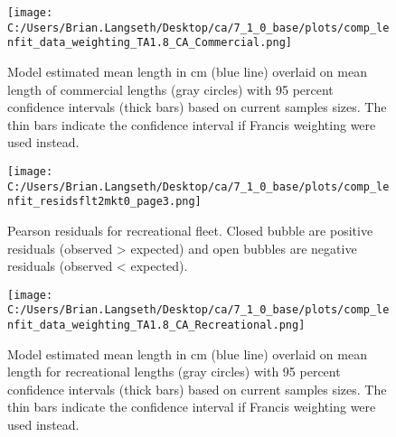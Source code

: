 \documentclass[11pt,
  english,
  a4paper,
]{article}
\begin{document}
\begin{figure}
\centering
\texttt{[image: C:/Users/Brian.Langseth/Desktop/ca/7\_1\_0\_base/plots/comp\_lenfit\_data\_weighting\_TA1.8\_CA\_Commercial.png]}
\caption{Model estimated mean length in cm (blue line) overlaid on mean length of commercial lengths (gray circles) with 95 percent confidence intervals (thick bars) based on current samples sizes. The thin bars indicate the confidence interval if Francis weighting were used instead.\label{fig:com-mean-len-fit}}
\end{figure}

\tagmcend\tagstructend


\begin{figure}
\centering
\texttt{[image: C:/Users/Brian.Langseth/Desktop/ca/7\_1\_0\_base/plots/comp\_lenfit\_residsflt2mkt0\_page3.png]}
\caption{Pearson residuals for recreational fleet. Closed bubble are positive residuals (observed \textgreater{} expected) and open bubbles are negative residuals (observed \textless{} expected).\label{fig:rec-pearson}}
\end{figure}

\tagmcend\tagstructend


\begin{figure}
\centering
\texttt{[image: C:/Users/Brian.Langseth/Desktop/ca/7\_1\_0\_base/plots/comp\_lenfit\_data\_weighting\_TA1.8\_CA\_Recreational.png]}
\caption{Model estimated mean length in cm (blue line) overlaid on mean length for recreational lengths (gray circles) with 95 percent confidence intervals (thick bars) based on current samples sizes. The thin bars indicate the confidence interval if Francis weighting were used instead.\label{fig:rec-mean-len-fit}}
\end{figure}

\tagmcend\tagstructend
\end{document}
